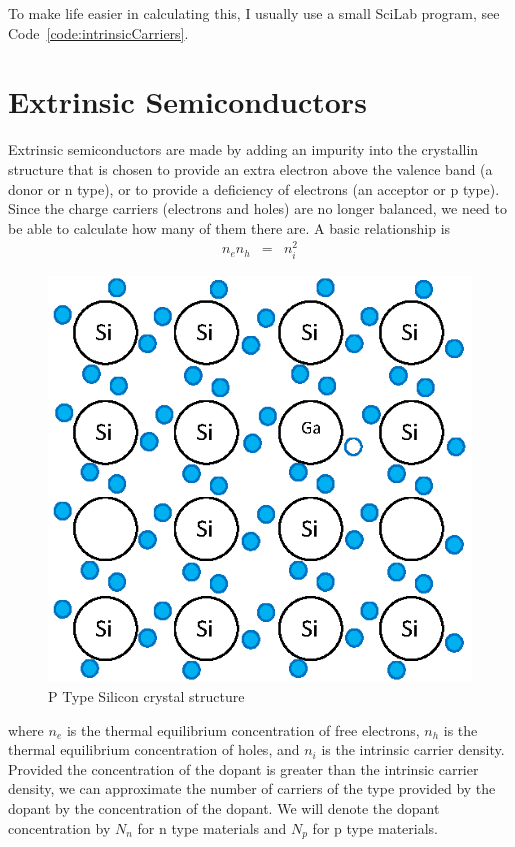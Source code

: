 To make life easier in calculating this, I usually use a small SciLab program, see Code~\ref{code:intrinsicCarriers}.


\section{Extrinsic Semiconductors}

Extrinsic semiconductors are made by adding an impurity into the crystallin structure that is chosen to provide an extra electron above the valence band (a donor or n type), or to provide a deficiency of electrons (an acceptor or p type).  Since the charge carriers (electrons and holes) are no longer balanced, we need to be able to calculate how many of them there are.  A basic relationship is
\begin{eqnarray}
n_e n_h &=& n_i^2 \label{eq:extrinsiccarrierdensity}
\end{eqnarray}
\begin{figure}
\vspace*{-.2in}
\centering
\caption{P Type Silicon crystal structure}\label{f-semiconductor-p}
\includegraphics{semiconductors_p} 
\vspace*{-.4in}
\vspace{1pt}
\end{figure}
where $n_e$ is the thermal equilibrium concentration of free electrons, $n_h$ is the thermal equilibrium concentration of holes, and $n_i$ is the intrinsic carrier density.  Provided the concentration of the dopant is greater than the intrinsic carrier density, we can approximate the number of carriers of the type provided by the dopant by the concentration of the dopant.  We will denote the dopant concentration by $N_n$ for n type materials and $N_p$ for p type materials.

